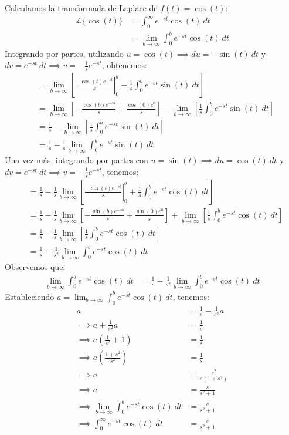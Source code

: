 \documentclass[12pt, a4paper]{article}
\begin{document}
Calculamos la transformada de Laplace de \(f(t) = \cos(t)\):
\begin{align*}
	\mathcal{L}\{\cos (t)\} &= \int_{0}^{\infty} e^{-st} \cos(t)\ dt \\
	&= \lim_{b \to \infty} \int_{0}^{b} e^{-st} \cos(t)\ dt
\end{align*}
Integrando por partes, utilizando \(u = \cos(t) \implies du = -\sin(t)\ dt\) y \(dv = e^{-st}\ dt \implies v = -\frac{1}{s} e^{-st}\), obtenemos:
\begin{align*}
	&= \lim_{b \to \infty} \left[ \left. \frac{-\cos (t) e^{-st}}{s} \right|_{0}^{b} - \frac{1}{s} \int_{0}^{b} e^{-st} \sin (t) \ dt \right] \\
	&= \lim_{b \to \infty} \left[ - \frac{\cos (b) e^{-sb}}{s} + \frac{\cos (0) e^{0}}{s} \right] - \lim_{b \to \infty} \left[ \frac{1}{s} \int_{0}^{b} e^{-st} \sin (t) \ dt \right] \\
	&= \frac{1}{s} - \lim_{b \to \infty} \left[ \frac{1}{s} \int_{0}^{b} e^{-st} \sin (t) \ dt \right] \\
	&= \frac{1}{s} - \frac{1}{s} \lim_{b \to \infty} \int_{0}^{b} e^{-st} \sin (t) \ dt
\end{align*}
Una vez más, integrando por partes con \(u = \sin (t) \implies du = \cos (t)\ dt\) y \(dv = e^{-st}\ dt \implies v = -\frac{1}{s} e^{-st}\), tenemos:
\begin{align*}
	&= \frac{1}{s} - \frac{1}{s} \lim_{b \to \infty} \left[ \left. \frac{-\sin (t) e^{-st}}{s} \right|_{0}^{b} + \frac{1}{s} \int_{0}^{b} e^{-st} \cos (t)\ dt \right] \\
	&= \frac{1}{s} - \frac{1}{s} \lim_{b \to \infty} \left[ - \frac{\sin (b) e^{-sb}}{s} + \frac{\sin (0) e^{0}}{s} \right] + \lim_{b \to \infty} \left[ \frac{1}{s} \int_{0}^{b} e^{-st} \cos (t)\ dt \right] \\
	&= \frac{1}{s} - \frac{1}{s} \lim_{b \to \infty} \left[ \frac{1}{s} \int_{0}^{b} e^{-st} \cos (t)\ dt \right] \\
	&= \frac{1}{s} - \frac{1}{s^{2}} \lim_{b \to \infty} \int_{0}^{b} e^{-st} \cos (t) \ dt
\end{align*}
Observemos que:
\begin{align*}
	\lim_{b \to \infty} \int_{0}^{b} e^{-st} \cos (t) \ dt &= \frac{1}{s} - \frac{1}{s^{2}}\lim_{b \to \infty} \int_{0}^{b} e^{-st} \cos (t) \ dt
\end{align*}
Estableciendo \(a = \lim_{b \to \infty} \int_{0}^{b} e^{-st} \cos (t) \ dt\), tenemos:
\begin{align*}
	a &= \frac{1}{s} - \frac{1}{s ^{2}} a \\
	\implies a + \frac{1}{s ^{2}} a &= \frac{1}{s} \\
	\implies a \left(\frac{1}{s ^{2}} + 1 \right) &= \frac{1}{s} \\
	\implies a \left( \frac{1+s ^{2}}{s ^{2}} \right) &= \frac{1}{s} \\
	\implies a &= \frac{s ^{2}}{s(1+s ^{2})} \\
	\implies a &= \frac{s}{s ^{2} + 1} \\
	\implies \lim_{b \to \infty} \int_{0}^{b} e^{-st} \cos (t) \ dt &= \frac{s}{s ^{2} + 1} \\
	\implies \int_{0}^{\infty} e^{-st} \cos (t) \ dt &= \frac{s}{s ^{2} + 1}
\end{align*}
\end{document}
